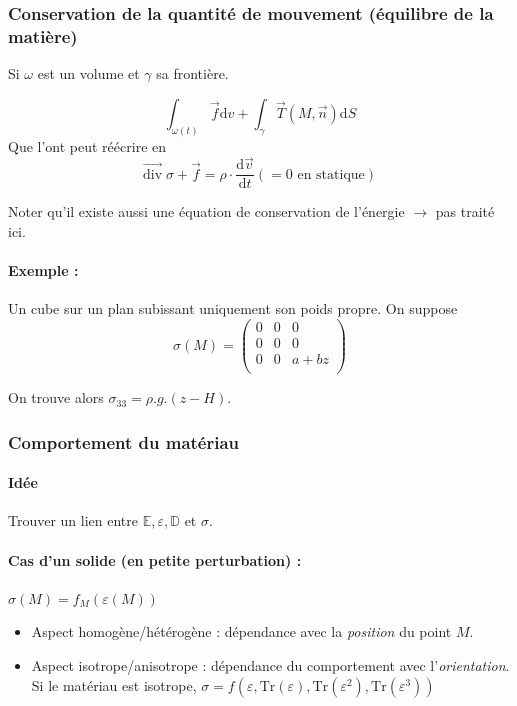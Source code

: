 \documentclass{article}
\newcommand{\deriv}{\mathrm{d}}
\begin{document}
\subsubsection{Conservation de la quantité de mouvement (équilibre de la matière)}

Si $\omega$ est un volume et $\gamma$ sa frontière.

\[\int_{\omega(t)} \vec{f} \deriv v + \int_{\gamma} \vec{T}(M,\vec{n}) \deriv S \]
Que l'ont peut réécrire en
\[ \overrightarrow{\text{div}}\; \sigma + \vec{f} = \rho \cdot \dfrac{\deriv \vec{v}}{\deriv t} (=0 \text{ en statique})\]

Noter qu'il existe aussi une équation de conservation de l'énergie $\to$ pas traité ici.

\paragraph{Exemple :}
Un cube sur un plan subissant uniquement son poids propre.
On suppose 
\[\sigma(M) = 
\begin{pmatrix}
0&0&0\\
0&0&0\\
0&0&a+bz\\
\end{pmatrix}
\]

On trouve alors $\sigma_{33} = \rho . g . (z-H)$.


\subsubsection{Comportement du matériau}
\paragraph{Idée} Trouver un lien entre $\mathbb{E},\varepsilon, \mathbb{D}$ et $\sigma$.

\paragraph{Cas d'un solide (en petite perturbation) :} $\sigma(M) = f_{M}(\varepsilon(M))$
\begin{itemize}[label=$\star$]
\item Aspect homogène/hétérogène : dépendance avec la \textit{position} du point $M$.
\item Aspect isotrope/anisotrope : dépendance du comportement avec l'\textit{orientation}. Si le matériau est isotrope, $\sigma = f(\varepsilon, \text{Tr}(\varepsilon), \text{Tr}(\varepsilon^2), \text{Tr}(\varepsilon^3))$
\end{itemize}
\end{document}
